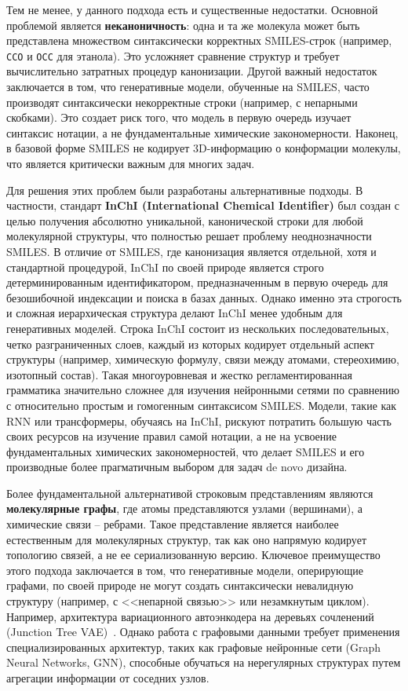 Тем не менее, у данного подхода есть и существенные недостатки. Основной проблемой является \textbf{неканоничность}: одна и та же молекула может быть представлена множеством синтаксически корректных SMILES-строк (например, \texttt{CCO} и \texttt{OCC} для этанола). Это усложняет сравнение структур и требует вычислительно затратных процедур канонизации. Другой важный недостаток заключается в том, что генеративные модели, обученные на SMILES, часто производят синтаксически некорректные строки (например, с непарными скобками). Это создает риск того, что модель в первую очередь изучает синтаксис нотации, а не фундаментальные химические закономерности. Наконец, в базовой форме SMILES не кодирует 3D-информацию о конформации молекулы, что является критически важным для многих задач.

Для решения этих проблем были разработаны альтернативные подходы. В частности, стандарт \textbf{InChI (International Chemical Identifier)} был создан с целью получения абсолютно уникальной, канонической строки для любой молекулярной структуры, что полностью решает проблему неоднозначности SMILES. В отличие от SMILES, где канонизация является отдельной, хотя и стандартной процедурой, InChI по своей природе является строго детерминированным идентификатором, предназначенным в первую очередь для безошибочной индексации и поиска в базах данных.
Однако именно эта строгость и сложная иерархическая структура делают InChI менее удобным для генеративных моделей. Строка InChI состоит из нескольких последовательных, четко разграниченных слоев, каждый из которых кодирует отдельный аспект структуры (например, химическую формулу, связи между атомами, стереохимию, изотопный состав). Такая многоуровневая и жестко регламентированная грамматика значительно сложнее для изучения нейронными сетями по сравнению с относительно простым и гомогенным синтаксисом SMILES. Модели, такие как RNN или трансформеры, обучаясь на InChI, рискуют потратить большую часть своих ресурсов на изучение правил самой нотации, а не на усвоение фундаментальных химических закономерностей, что делает SMILES и его производные более прагматичным выбором для задач de novo дизайна.

Более фундаментальной альтернативой строковым представлениям являются \textbf{молекулярные графы}, где атомы представляются узлами (вершинами), а химические связи -- ребрами. Такое представление является наиболее естественным для молекулярных структур, так как оно напрямую кодирует топологию связей, а не ее сериализованную версию. Ключевое преимущество этого подхода заключается в том, что генеративные модели, оперирующие графами, по своей природе не могут создать синтаксически невалидную структуру (например, с <<непарной связью>> или незамкнутым циклом). Например, архитектура вариационного автоэнкодера на деревьях сочленений (Junction Tree VAE)~\cite{kondratyev2023generative}. Однако работа с графовыми данными требует применения специализированных архитектур, таких как графовые нейронные сети (Graph Neural Networks, GNN), способные обучаться на нерегулярных структурах путем агрегации информации от соседних узлов.

